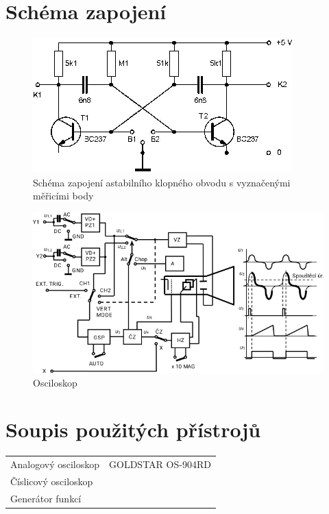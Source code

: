 \documentclass[5pt]{article}
\begin{document}
\section{Schéma zapojení­}
\begin{figure}[htp]
\centering
\includegraphics[scale=1.00]{scheme.png}
\caption{Schéma zapojení astabilního klopného obvodu s vyznačenými měřicími body}
\end{figure}
\begin{figure}[htp]
\centering
\includegraphics[scale=0.8]{block.png}
\caption{Osciloskop}
\end{figure}

\section{Soupis použitých přístrojů}

\begin{tabular}{ll}
	Analogový osciloskop & GOLDSTAR OS-904RD\\
	Číslicový osciloskop\\
	Generátor funkcí
\end{tabular}
\end{document}
